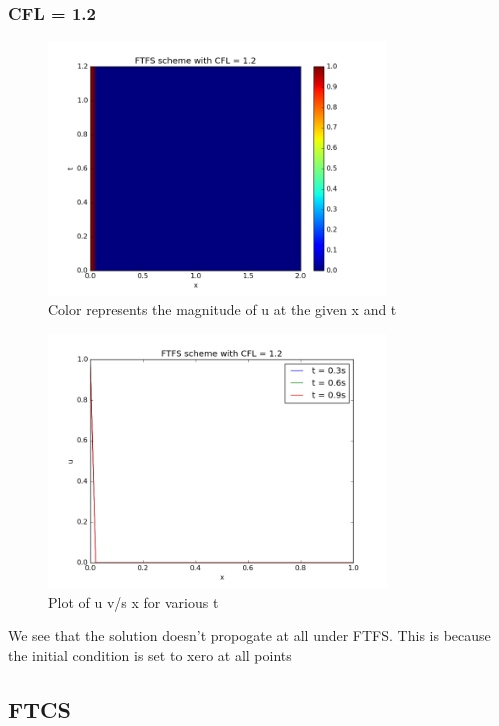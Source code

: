 \documentclass[11pt, a4paper]{article}
\begin{document}
\subsubsection{CFL = 1.2}
\begin{figure}[H]
 \centering
 \includegraphics[width = 0.8\textwidth]{FTFS1_12.png}
 \caption{Color represents the magnitude of u at the given x and t}
\end{figure}

\begin{figure}[H]
 \centering
 \includegraphics[width = 0.8\textwidth]{FTFS1_12_1.png}
 \caption{Plot of u v/s x for various t}
\end{figure}

We see that the solution doesn't propogate at all under FTFS. This is because the initial condition is set to xero at all points

\subsection{FTCS}
\end{document}
